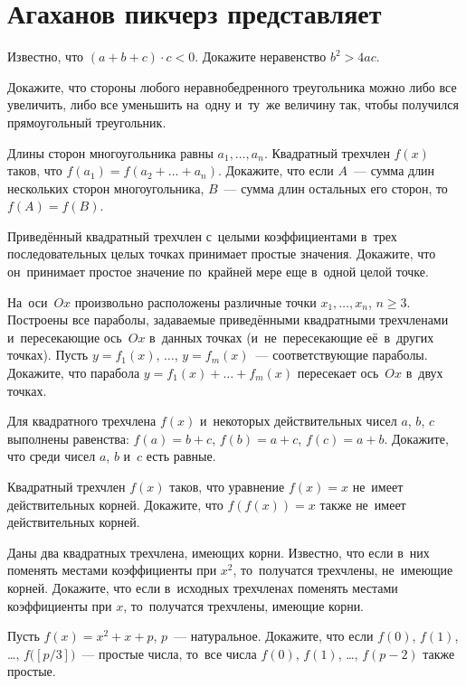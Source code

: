 
\section*{Агаханов пикчерз представляет}

\begin{problems}

\item
Известно, что $(a + b + c) \cdot c < 0$.
Докажите неравенство $b^2 > 4 a c$.

\item
Докажите, что стороны любого неравнобедренного треугольника можно либо все
увеличить, либо все уменьшить на~одну и~ту~же величину так, чтобы получился
прямоугольный треугольник.

\item
Длины сторон многоугольника равны $a_1, \ldots, a_n$.
Квадратный трехчлен $f(x)$ таков, что $f(a_1) = f(a_2 + \ldots + a_n)$.
Докажите, что если $A$~--- сумма длин нескольких сторон многоугольника, $B$~---
сумма длин остальных его сторон, то~$f(A) = f(B)$.

\item
Приведённый квадратный трехчлен с~целыми коэффициентами в~трех последовательных
целых точках принимает простые значения.
Докажите, что он~принимает простое значение по~крайней мере еще в~одной целой
точке.

\item
На~оси~$Ox$ произвольно расположены различные точки $x_1, \ldots, x_n$, $n
\geqslant 3$.
Построены все параболы, задаваемые приведёнными квадратными трехчленами
и~пересекающие ось~$Ox$ в~данных точках (и~не~пересекающие её~в~других точках).
Пусть $y = f_1(x)$, $\ldots$, $y = f_m(x)$~--- соответствующие параболы.
Докажите, что парабола $y = f_1(x) + \ldots + f_m(x)$ пересекает ось~$Ox$
в~двух точках.

\item
Для квадратного трехчлена $f(x)$ и~некоторых действительных чисел $a$, $b$, $c$
выполнены равенства: $f(a) = b + c$, $f(b) = a + c$, $f(c) = a + b$.
Докажите, что среди чисел $a$, $b$ и~$c$ есть равные.

\item
Квадратный трехчлен $f(x)$ таков, что уравнение $f(x) = x$ не~имеет
действительных корней.
Докажите, что $f(f(x)) = x$ также не~имеет действительных корней.

\item
Даны два квадратных трехчлена, имеющих корни.
Известно, что если в~них поменять местами коэффициенты при $x^2$, то~получатся
трехчлены, не~имеющие корней.
Докажите, что если в~исходных трехчленах поменять местами коэффициенты при $x$,
то~получатся трехчлены, имеющие корни.

\item
Пусть $f(x) = x^2 + x + p$, $p$~--- натуральное.
Докажите, что если $f(0)$, $f(1)$, \dots, $f\bigl( [p / 3] \bigr)$~---
простые числа, то~все числа $f(0)$, $f(1)$, \dots, $f(p-2)$ также простые.

\end{problems}

